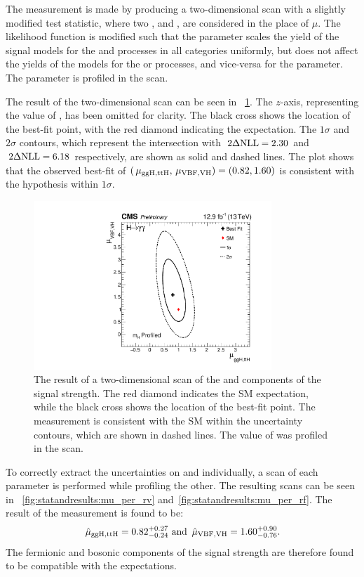 The measurement is made by producing a two-dimensional \DNLL scan with a slightly modified test statistic, where two \POI\s, \muF and \muV, are considered in the place of $\mu$. The likelihood function is modified such that the \muF parameter scales the yield of the signal models for the \ggH and \ttH processes in all categories uniformly, but does not affect the yields of the models for the \VBF or \VH processes, and vice-versa for the \muV parameter. The \mH parameter is profiled in the scan.

The result of the two-dimensional scan can be seen in \Fig~\ref{fig:statandresults:mu_per_rvrf}. The $z$-axis, representing the value of \DNLL, has been omitted for clarity.  The black cross shows the location of the best-fit point, with the red diamond indicating the \SM expectation. The $1\sigma$ and $2\sigma$ contours, which represent the intersection with $\,2\Delta\text{NLL}=2.30$ and $\,2\Delta\text{NLL}=6.18$ respectively, are shown as solid and dashed lines. The plot shows that the observed best-fit of $(\,\mu_{\text{ggH},\text{ttH}} ,\,\mu_{\text{VBF},\text{VH}} )=(0.82,1.60)$ is consistent with the \SM hypothesis within $1\sigma$.
\begin{figure}[ht!]
\centering
\includegraphics[width=0.8\textwidth]{statandresultsFigures/RVRFScanProfileMH.pdf} 
\caption{The result of a two-dimensional \DNLL scan of the \muF and \muV components of the signal strength. The red diamond indicates the SM expectation, while the black cross shows the location of the best-fit point. The measurement is consistent with the SM within the uncertainty contours, which are shown in dashed lines. The value of \mH was profiled in the scan.}

\label{fig:statandresults:mu_per_rvrf}
\end{figure}

To correctly extract the uncertainties on \muF and \muV individually, a \DNLL scan of each parameter is performed while profiling the other. The resulting scans can be seen in \Fig\s~\ref{fig:statandresults:mu_per_rv} and~\ref{fig:statandresults:mu_per_rf}. The result of the measurement is found to be:
\begin{equation*}
\,\hat{\mu}_{\text{ggH},\text{ttH}}=0.82^{+0.27}_{-0.24} \text{ and } \,\hat{\mu}_{\text{VBF},\text{VH}}=1.60^{+0.90}_{-0.76}. 
\end{equation*}
The fermionic and bosonic components of the signal strength are therefore found to be compatible with the \SM expectations. 


